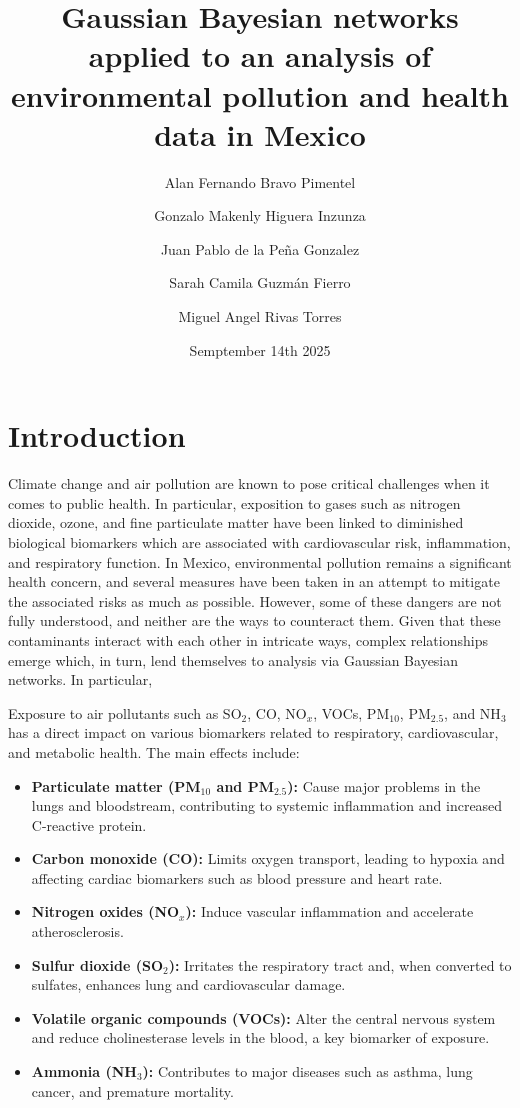 \documentclass[twocolumn]{article}
\title{Gaussian Bayesian networks applied to an analysis of environmental pollution and health data in Mexico }
\author{
Alan Fernando Bravo Pimentel \and
Gonzalo Makenly Higuera Inzunza \and
Juan Pablo de la Peña Gonzalez \and
Sarah Camila Guzmán Fierro \and
Miguel Angel Rivas Torres
}
\date{Semptember 14th 2025}
\begin{document}
\maketitle

\begin{abstract}
\end{abstract}

\section{Introduction}
Climate change and air pollution are known to pose critical challenges when it comes to public health. In particular, exposition to gases such as nitrogen dioxide, ozone, and fine particulate matter have been linked to diminished biological biomarkers which are associated with cardiovascular risk, inflammation, and respiratory function. In Mexico, environmental pollution remains a significant health concern, and several measures have been taken in an attempt to mitigate the associated risks as much as possible. However, some of these dangers are not fully understood, and neither are the ways to counteract them.
Given that these contaminants interact with each other in intricate ways, complex relationships emerge which, in turn,  lend themselves to analysis via Gaussian Bayesian networks. 
In particular,

\vspace{0.5cm}

Exposure to air pollutants such as SO$_2$, CO, NO$_x$, VOCs, PM$_{10}$, PM$_{2.5}$, and NH$_3$ has a direct impact on various biomarkers related to respiratory, cardiovascular, and metabolic health. The main effects include:

\begin{itemize}
    \item \textbf{Particulate matter (PM$_{10}$ and PM$_{2.5}$):} Cause major problems in the lungs and bloodstream, contributing to systemic inflammation and increased C-reactive protein.
    \item \textbf{Carbon monoxide (CO):} Limits oxygen transport, leading to hypoxia and affecting cardiac biomarkers such as blood pressure and heart rate.
    \item \textbf{Nitrogen oxides (NO$_x$):} Induce vascular inflammation and accelerate atherosclerosis.
    \item \textbf{Sulfur dioxide (SO$_2$):} Irritates the respiratory tract and, when converted to sulfates, enhances lung and cardiovascular damage.
    \item \textbf{Volatile organic compounds (VOCs):} Alter the central nervous system and reduce cholinesterase levels in the blood, a key biomarker of exposure.
    \item \textbf{Ammonia (NH$_3$):} Contributes to major diseases such as asthma, lung cancer, and premature mortality.
\end{itemize}
\end{document}
